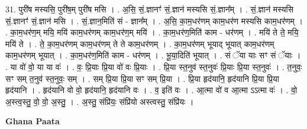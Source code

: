 \documentclass[17pt]{extarticle}
\begin{document}
31. पुरी॑ष मस्यसि॒ पुरी॑ष॒म् पुरी॑ष मसि । . अ॒सि॒ सं॒.ज्ञानꣳ॑ सं॒.ज्ञान॑ मस्यसि सं॒.ज्ञान᳚म् । . सं॒.ज्ञान॑ मस्यसि सं॒.ज्ञानꣳ॑ सं॒.ज्ञान॑ मसि । . सं॒.ज्ञान॒मिति॑ सं - ज्ञान᳚म् । . अ॒सि॒ का॒म॒धर॑णम् काम॒धर॑ण मस्यसि काम॒धर॑णम् । . का॒म॒धर॑ण॒म् मयि॒ मयि॑ काम॒धर॑णम् काम॒धर॑ण॒म् मयि॑ । . का॒म॒धर॑ण॒मिति॑ काम - धर॑णम् । . मयि॑ ते ते॒ मयि॒ मयि॑ ते । . ते॒ का॒म॒धर॑णम् काम॒धर॑णम् ते ते काम॒धर॑णम् । . का॒म॒धर॑णम् भूयाद् भूयात् काम॒धर॑णम् काम॒धर॑णम् भूयात् । . का॒म॒धर॑ण॒मिति॑ काम - धर॑णम् । . भू॒या॒दिति॑ भूयात् । . सं ॅया याः सꣳ सं ॅयाः । . या वो॑ वो॒ या या वः॑ । . वः॒ प्रि॒याः प्रि॒या वो॑ वः प्रि॒याः । . प्रि॒या स्त॒नुव॑ स्त॒नुवः॑ प्रि॒याः प्रि॒या स्त॒नुवः॑ । . त॒नुवः॒ सꣳ सम् त॒नुव॑ स्त॒नुवः॒ सम् । . सम् प्रि॒या प्रि॒या सꣳ सम् प्रि॒या । . प्रि॒या हृद॑यानि॒ हृद॑यानि प्रि॒या प्रि॒या हृद॑यानि । . हृद॑यानि वो वो॒ हृद॑यानि॒ हृद॑यानि वः । . व॒ इति॑ वः । . आ॒त्मा वो॑ व आ॒त्मा ऽऽत्मा वः॑ । . वो॒ अ॒स्त्व॒स्तु॒ वो॒ वो॒ अ॒स्तु॒ । . अ॒स्तु॒ संप्रि॑यः॒ संप्रि॑यो अस्त्वस्तु॒ संप्रि॑यः । \newline

\textbf{Ghana Paata } \newline
\end{document}
